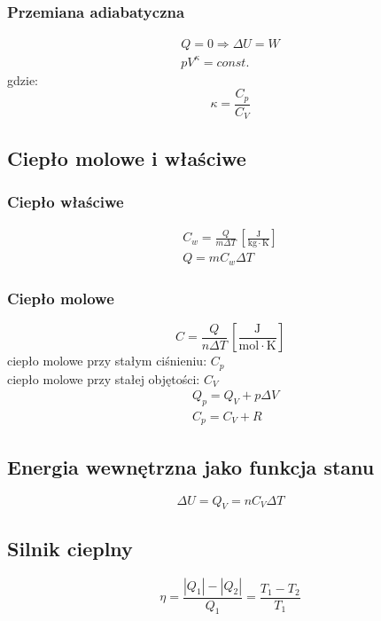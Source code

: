 \documentclass{article}
\numberwithin{equation}{section}
\newcommand{\unit}[1]{\, \left[\mathrm{#1}\right]}
\begin{document}
      \subsubsection{Przemiana adiabatyczna}
        \begin{gather}
          Q = 0 \Rightarrow \Delta U = W\\
          pV^\kappa = const.
        \end{gather}
        gdzie:
        \begin{equation}
          \kappa = \frac{C_p}{C_V}
        \end{equation}
    \subsection{Ciepło molowe i właściwe}
      \subsubsection{Ciepło właściwe}
        \begin{gather}
          C_w = \frac{Q}{m\Delta T} \unit{\frac{J}{kg\cdot K}}\\
          Q = mC_w\Delta T
        \end{gather}
      \subsubsection{Ciepło molowe}
        \begin{equation}
          C = \frac{Q}{n\Delta T} \unit{\frac{J}{mol\cdot K}}
        \end{equation}
        ciepło molowe przy stałym ciśnieniu: $C_p$\\
        ciepło molowe przy stałej objętości: $C_V$
        \begin{align}
          &Q_p = Q_V + p\Delta V\\
          &C_p = C_V + R
        \end{align}
    \subsection{Energia wewnętrzna jako funkcja stanu}
      \begin{equation}
        \Delta U = Q_V = nC_V\Delta T
      \end{equation}
      \subsection{Silnik cieplny}
      \begin{equation}
        \eta = \frac{|Q_1|-|Q_2|}{Q_1} = \frac{T_1 - T_2}{T_1}
      \end{equation}
\end{document}

